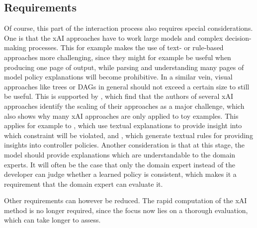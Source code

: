 \documentclass[twoside,11pt]{article}
\begin{document}
\subsection{Requirements}
Of course, this part of the interaction process also requires special considerations. One is that the xAI approaches have to work large models and complex decision-making processes. This for example makes the use of text- or rule-based approaches more challenging, since they might for example be useful when producing one page of output, while parsing and understanding many pages of model policy explanations will become prohibitive. In a similar vein, visual approaches like trees or DAGs in general should not exceed a certain size to still be useful. 
This is supported by \citet{WellsBednarz:2021:xAIRLSurvey}, which find that the authors of several xAI approaches identify the scaling of their approaches as a major challenge, which also shows why many xAI approaches are only applied to toy examples. This applies for example to \citet{TabrezHayes:2019:xRLTextualExplanations}, which use textual explanations to provide insight into which constraint will be violated, and \citet{HayesShah:2017:AutonomousPolicyExplanation}, which generate textual rules for providing insights into controller policies.
Another consideration is that at this stage, the model should provide explanations which are understandable to the domain experts. It will often be the case that only the domain expert instead of the developer can judge whether a learned policy is consistent, which makes it a requirement that the domain expert can evaluate it.

Other requirements can however be reduced. The rapid computation of the xAI method is no longer required, since the focus now lies on a thorough evaluation, which can take longer to assess.
\end{document}
